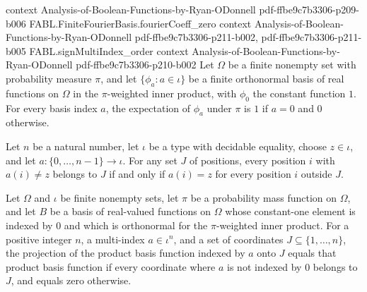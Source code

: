 \begin{theorem}
  {context}
  {Analysis-of-Boolean-Functions-by-Ryan-ODonnell}
  {pdf-ffbe9c7b3306-p209-b006}
\proofstep
  {FABL.FiniteFourierBasis.fourierCoeff_zero}
  {context}
  {Analysis-of-Boolean-Functions-by-Ryan-ODonnell}
  {pdf-ffbe9c7b3306-p211-b002,
    pdf-ffbe9c7b3306-p211-b005}
\proofstep
  {FABL.signMultiIndex_order}
  {context}
  {Analysis-of-Boolean-Functions-by-Ryan-ODonnell}
  {pdf-ffbe9c7b3306-p210-b002}
Let $\Omega$ be a finite nonempty set with probability measure $\pi$, and let
$\{\phi_a:a\in\iota\}$ be a finite orthonormal basis of real functions on $\Omega$ in
the $\pi$-weighted inner product, with $\phi_0$ the constant function $1$. For every
basis index $a$, the expectation of $\phi_a$ under $\pi$ is $1$ if $a=0$ and $0$
otherwise.
\end{theorem}

\begin{theorem}
\label{FABL.multiIndexSupport_subset_iff}
\leanok
{}
Let $n$ be a natural number, let $\iota$ be a type with decidable equality, choose
$z\in\iota$, and let $a:\{0,\ldots,n-1\}\to\iota$. For any set $J$ of positions, every
position $i$ with $a(i)\ne z$ belongs to $J$ if and only if $a(i)=z$ for every position
$i$ outside $J$.
\end{theorem}

\begin{theorem}
\label{FABL.FiniteFourierBasis.projectOnCoordinates_productFunction}
\leanok
{}
Let $\Omega$ and $\iota$ be finite nonempty sets, let $\pi$ be a probability mass
function on $\Omega$, and let $B$ be a basis of real-valued functions on $\Omega$ whose
constant-one element is indexed by $0$ and which is orthonormal for the $\pi$-weighted
inner product. For a positive integer $n$, a multi-index $a\in\iota^n$, and a set of
coordinates $J\subseteq\{1,\ldots,n\}$, the projection of the product basis function
indexed by $a$ onto $J$ equals that product basis function if every coordinate where $a$
is not indexed by $0$ belongs to $J$, and equals zero otherwise.
\end{theorem}

